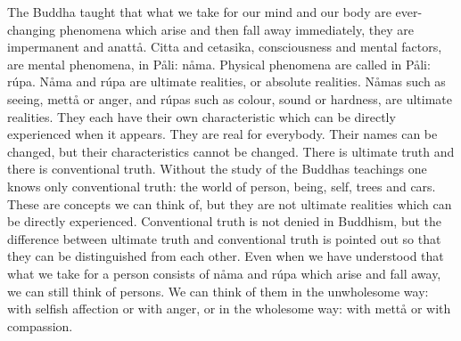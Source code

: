 \documentclass[12pt,twoside]{article}
\begin{document}
The Buddha taught that what we take for
{\textasciigrave}{\textasciigrave}our
mind{\textquotesingle}{\textquotesingle} and
{\textasciigrave}{\textasciigrave}our
body{\textquotesingle}{\textquotesingle} are ever{}-changing phenomena
which arise and then fall away immediately, they are impermanent and
anatt{\aa}. Citta and cetasika, consciousness and mental factors, are
mental phenomena, in P{\aa}li: n{\aa}ma. Physical phenomena are called
in P{\aa}li: r\'upa. N{\aa}ma and r\'upa are ultimate realities, or
absolute realities. N{\aa}mas such as seeing, mett{\aa} or anger, and
r\'upas such as colour, sound or hardness, are ultimate realities. They
each have their own characteristic which can be directly experienced
when it appears. They are real for everybody. Their names can be
changed, but their characteristics cannot be changed. There is ultimate
truth and there is conventional truth. Without the study of the
Buddha{\textquotesingle}s teachings one knows only conventional truth:
the world of person, being, self, trees and cars. These are concepts we
can think of, but they are not ultimate realities which can be directly
experienced. Conventional truth is not denied in Buddhism, but the
difference between ultimate truth and conventional truth is pointed out
so that they can be distinguished from each other. Even when we have
understood that what we take for a person consists of n{\aa}ma and
r\'upa which arise and fall away, we can still think of persons. We can
think of them in the unwholesome way: with selfish affection or with
anger, or in the wholesome way: with mett{\aa} or with compassion. 
\end{document}

